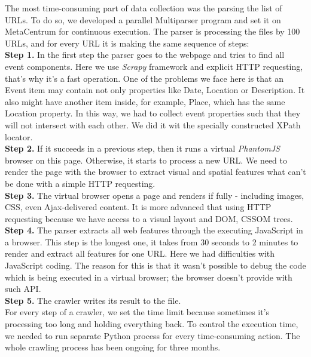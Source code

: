 The most time-consuming part of data collection was the parsing the list of URLs. To do so, we developed a parallel Multiparser program and set it on MetaCentrum for continuous execution. The parser is processing the files by 100 URLs, and for every URL it is making the same sequence of steps:\\

\noindent\textbf{Step 1.} In the first step the parser goes to the webpage and tries to find all event components. Here we use \textit{Scrapy} framework and explicit HTTP requesting, that's why it's a fast operation. One of the problems we face here is that an Event item may contain not only properties like Date, Location or Description. It also might have another item inside, for example, Place, which has the same Location property. In this way, we had to collect event properties such that they will not intersect with each other. We did it wit the specially constructed XPath locator. \\

\noindent\textbf{Step 2.} If it succeeds in a previous step, then it runs a virtual \textit{PhantomJS} browser on this page. Otherwise, it starts to process a new URL. We need to render the page with the browser to extract visual and spatial features what can't be done with a simple HTTP requesting.\\

\noindent\textbf{Step 3.} The virtual browser opens a page and renders if fully - including images, CSS, even Ajax-delivered content. It is more advanced that using HTTP requesting because we have access to a visual layout and DOM, CSSOM trees.\\

\noindent\textbf{Step 4.} The parser extracts all web features through the executing JavaScript in a browser. This step is the longest one, it takes from 30 seconds to 2 minutes to render and extract all features for one URL. Here we had difficulties with JavaScript coding. The reason for this is that it wasn't possible to debug the code which is being executed in a virtual browser; the browser doesn't provide with such API.\\

\noindent\textbf{Step 5.} The crawler writes its result to the file. \\

For every step of a crawler, we set the time limit because sometimes it's processing too long and holding everything back. To control the execution time, we needed to run separate Python process for every time-consuming action. The whole crawling process has been ongoing for three months.\\

